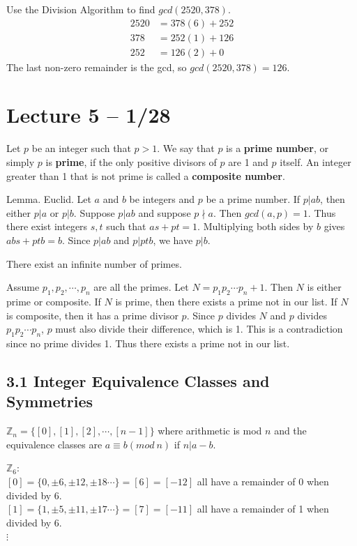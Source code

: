 \documentclass{article}
\newcommand{\Z}{\mathbb{Z}}
\begin{document}
\begin{example}
  Use the Division Algorithm to find $gcd(2520, 378)$.
  \begin{align*}
    2520&=378(6)+252\\
    378&=252(1)+126\\
    252&=126(2)+0
  \end{align*}
  The last non-zero remainder is the gcd, so $gcd(2520, 378)=126$.
\end{example}
\section{Lecture 5 -- 1/28}
\begin{theorem}
  Let $p$ be an integer such that $p>1$. We say that $p$ is a \textbf{prime number}, or simply $p$ is \textbf{prime}, if the only positive divisors of $p$ are 1 and $p$ itself. An integer greater than 1 that is not prime is called a \textbf{composite number}.
\end{theorem}
Lemma. Euclid. Let $a$ and $b$ be integers and $p$ be a prime number. If $p|ab$, then either $p|a$ or $p|b$. Suppose $p|ab$ and suppose $p\nmid a$. Then $gcd(a,p)=1$. Thus there exist integers $s,t$ such that $as+pt=1$. Multiplying both sides by $b$ gives $abs+ptb=b$. Since $p|ab$ and $p|ptb$, we have $p|b$.
\begin{theorem}
  There exist an infinite number of primes.

  Assume $p_1, p_2, \cdots, p_n$ are all the primes. Let $N=p_1p_2\cdots p_n+1$. Then $N$ is either prime or composite. If $N$ is prime, then there exists a prime not in our list. If $N$ is composite, then it has a prime divisor $p$. Since $p$ divides $N$ and $p$ divides $p_1p_2\cdots p_n$, $p$ must also divide their difference, which is 1. This is a contradiction since no prime divides 1. Thus there exists a prime not in our list.
\end{theorem}
\subsection{3.1 Integer Equivalence Classes and Symmetries}
$\Z_n=\{[0], [1], [2],\cdots,[n-1]\}$ where arithmetic is mod $n$ and the equivalence classes are $a\equiv b(mod\ n)$ if $n|a-b$.
\begin{example}
  $\Z_6:$\\
  $[0]=\{0, \pm6, \pm12, \pm18\cdots\}=[6]=[-12]$ all have a remainder of 0 when divided by 6.\\
  $[1]=\{1, \pm5, \pm11, \pm17\cdots\}=[7]=[-11]$ all have a remainder of 1 when divided by 6.\\
  $\vdots$
\end{example}
\end{document}
